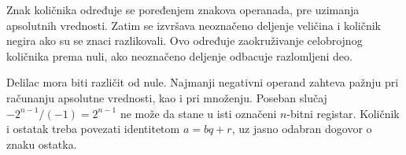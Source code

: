 Znak količnika određuje se poređenjem znakova operanada, pre uzimanja apsolutnih vrednosti. Zatim se izvršava neoznačeno deljenje veličina i količnik negira ako su se znaci razlikovali. Ovo određuje zaokruživanje celobrojnog količnika prema nuli, ako neoznačeno deljenje odbacuje razlomljeni deo.

Delilac mora biti različit od nule. Najmanji negativni operand zahteva pažnju pri računanju apsolutne vrednosti, kao i pri množenju. Poseban slučaj $-2^{n-1}/(-1)=2^{n-1}$ ne može da stane u isti označeni $n$-bitni registar. Količnik i ostatak treba povezati identitetom $a=bq+r$, uz jasno odabran dogovor o znaku ostatka.
